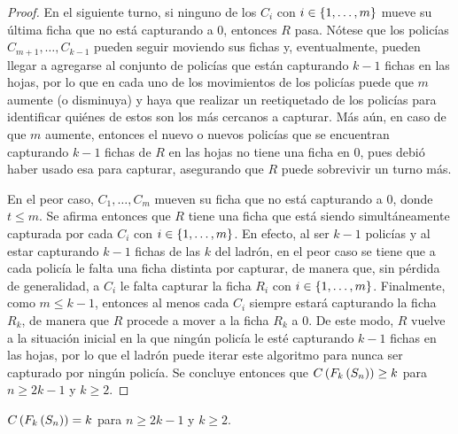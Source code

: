 \begin{proof}
    En el siguiente turno, si ninguno de los $C_{i}$ con $i\in\{1,\dots, m\}$ mueve
    su \'ultima ficha que no est\'a capturando a $0$, entonces $R$ pasa. N\'otese que
    los polic\'ias $C_{m+1},\dots,C_{{k-1}}$ pueden seguir moviendo sus fichas y,
    eventualmente, pueden llegar a agregarse al conjunto de polic\'ias que est\'an
    capturando $k-1$ fichas en las hojas, por lo que en cada uno de los
    movimientos de los polic\'ias puede que $m$ aumente (o disminuya) y haya que
    realizar un reetiquetado de los polic\'ias para identificar qui\'enes de estos
    son los m\'as cercanos a capturar. M\'as a\'un, en caso de que $m$ aumente,
    entonces el nuevo o nuevos polic\'ias que se encuentran capturando $k-1$
    fichas de $R$ en las hojas no tiene una ficha en $0$, pues debi\'o haber usado
    esa para capturar, asegurando que $R$ puede sobrevivir un turno m\'as.

    En el peor caso, $C_1,\dots, C_m$ mueven su ficha que no est\'a capturando a
    $0$, donde $t\leq m$. Se afirma entonces que $R$ tiene una ficha que est\'a
    siendo simult\'aneamente capturada por cada $C_{i}$ con $i\in \{1,\dots, m\}$. En
    efecto, al ser $k-1$ polic\'ias y al estar capturando $k-1$ fichas de las $k$
    del ladr\'on, en el peor caso se tiene que a cada polic\'ia le falta una ficha
    distinta por capturar, de manera que, sin p\'erdida de generalidad, a $C_{i}$
    le falta capturar la ficha $R_i$ con $i\in \{1,\dots, m\}$. Finalmente, como
    $m\leq k-1$, entonces al menos cada $C_{i}$ siempre estar\'a capturando la
    ficha $R_k$, de manera que $R$ procede a mover a la ficha $R_k$ a $0$. De
    este modo, $R$ vuelve a la situaci\'on inicial en la que ning\'un polic\'ia le
    est\'e capturando $k-1$ fichas en las hojas, por lo que el ladr\'on puede iterar
    este algoritmo para nunca ser capturado por ning\'un polic\'ia. Se concluye
    entonces que $C\left( F_k \left( S_n\right)\right) \geq k$ para $n\geq 2k-1$ y $k\geq 2$.
    
\end{proof}

\begin{teorema}
\label{teo:numero-de-policia-estrella}
    $C\left( F_k\left( S_n\right)\right)=k$ para $n\geq 2k-1$ y $k\geq 2$.
\end{teorema}

